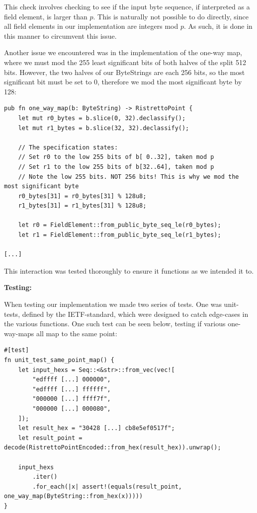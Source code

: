 \documentclass{article}
\begin{document}
This check involves checking to see if the input byte sequence,
if interpreted as a field element, is larger than $p$. This is
naturally not possible to do directly, since all field elements in
our implementation are integers mod $p$. As such, it is done in this
manner to circumvent this issue.

Another issue we encountered was in the implementation of the one-way
map, where we must mod the 255 least significant bits of both halves
of the split 512 bits. However, the two halves of our ByteStrings are
each 256 bits, so the most significant bit must be set to 0, therefore
we mod the most significant byte by 128:

\begin{lstlisting}
pub fn one_way_map(b: ByteString) -> RistrettoPoint {
	let mut r0_bytes = b.slice(0, 32).declassify();
	let mut r1_bytes = b.slice(32, 32).declassify();

	// The specification states:
	// Set r0 to the low 255 bits of b[ 0..32], taken mod p
	// Set r1 to the low 255 bits of b[32..64], taken mod p
	// Note the low 255 bits. NOT 256 bits! This is why we mod the most significant byte
	r0_bytes[31] = r0_bytes[31] % 128u8;
	r1_bytes[31] = r1_bytes[31] % 128u8;

	let r0 = FieldElement::from_public_byte_seq_le(r0_bytes);
	let r1 = FieldElement::from_public_byte_seq_le(r1_bytes);

[...]
\end{lstlisting}

This interaction was tested thoroughly to ensure it functions as we 
intended it to.

\textbf{Testing:}

When testing our implementation we made two series of tests. 
One was unit-tests, defined by the IETF-standard, which were designed 
to catch edge-cases in the various functions. One such test can be 
seen below, testing if various one-way-maps all map to the same point:

\begin{lstlisting}
#[test]
fn unit_test_same_point_map() {
	let input_hexs = Seq::<&str>::from_vec(vec![
		"edffff [...] 000000",
		"edffff [...] ffffff",
		"000000 [...] ffff7f",
		"000000 [...] 000080",
	]);
	let result_hex = "30428 [...] cb8e5ef0517f";
	let result_point = decode(RistrettoPointEncoded::from_hex(result_hex)).unwrap();

	input_hexs
		.iter()
		.for_each(|x| assert!(equals(result_point, one_way_map(ByteString::from_hex(x)))))
}
\end{lstlisting}
\end{document}

